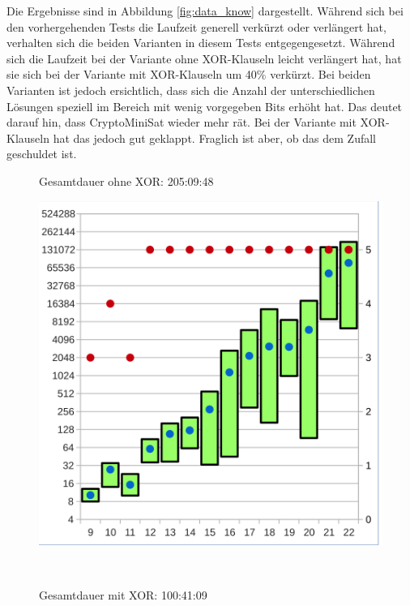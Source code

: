 Die Ergebnisse sind in Abbildung \ref{fig:data_know} dargestellt. Während sich bei den vorhergehenden Tests die Laufzeit generell verkürzt oder
verlängert hat, verhalten sich die beiden Varianten in diesem Tests entgegengesetzt. Während sich die Laufzeit bei der Variante ohne XOR-Klauseln
leicht verlängert hat, hat sie sich bei der Variante mit XOR-Klauseln um 40\% verkürzt. Bei beiden Varianten ist jedoch ersichtlich, dass sich die
Anzahl der unterschiedlichen Lösungen speziell im Bereich mit wenig vorgegeben Bits erhöht hat. Das deutet darauf hin, dass CryptoMiniSat wieder
mehr rät. Bei der Variante mit XOR-Klauseln hat das jedoch gut geklappt. Fraglich ist aber, ob das dem Zufall geschuldet ist.
\begin{figure}[!h]
  \centering
  \begin{minipage}[c]{0.45\textwidth}
  \begin{flushleft}Gesamtdauer ohne XOR: 205:09:48\end{flushleft}
  \includegraphics[scale=0.55]{images/data_know_knf}
  \end{minipage}
  \begin{minipage}[c]{0.09\textwidth}
  ~~
  \end{minipage}
  \begin{minipage}[c]{0.45\textwidth}
  \begin{flushleft}Gesamtdauer mit XOR: 100:41:09\end{flushleft}

\end{minipage}
\end{figure}
